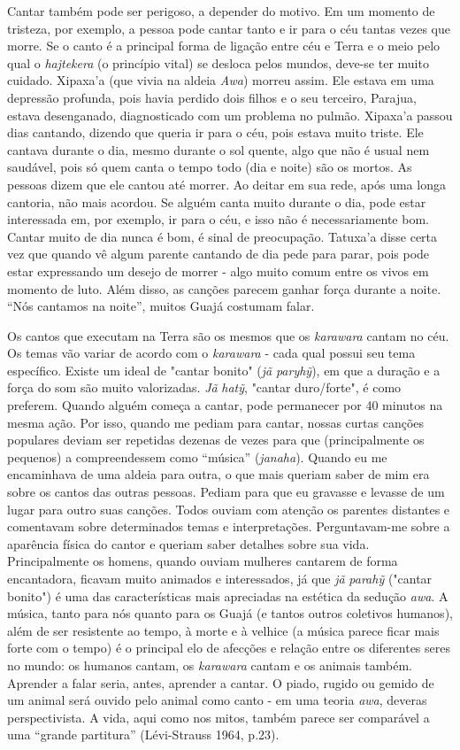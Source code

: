 Cantar também pode ser perigoso, a depender do motivo. Em um momento de
tristeza, por exemplo, a pessoa pode cantar tanto e ir para o céu tantas
vezes que morre. Se o canto é a principal forma de ligação entre céu e
Terra e o meio pelo qual o \emph{hajtekera} (o princípio vital) se
desloca pelos mundos, deve-se ter muito cuidado. Xipaxa'a (que vivia na
aldeia \emph{Awa}) morreu assim. Ele estava em uma depressão profunda,
pois havia perdido dois filhos e o seu terceiro, Parajua, estava
desenganado, diagnosticado com um problema no pulmão. Xipaxa'a passou
dias cantando, dizendo que queria ir para o céu, pois estava muito
triste. Ele cantava durante o dia, mesmo durante o sol quente, algo que
não é usual nem saudável, pois só quem canta o tempo todo (dia e noite)
são os mortos. As pessoas dizem que ele cantou até morrer. Ao deitar em
sua rede, após uma longa cantoria, não mais acordou. Se alguém canta
muito durante o dia, pode estar interessada em, por exemplo, ir para o
céu, e isso não é necessariamente bom. Cantar muito de dia nunca é bom,
é sinal de preocupação. Tatuxa'a disse certa vez que quando vê algum
parente cantando de dia pede para parar, pois pode estar expressando um
desejo de morrer - algo muito comum entre os vivos em momento de luto.
Além disso, as canções parecem ganhar força durante a noite. ``Nós
cantamos na noite'', muitos Guajá costumam falar.

Os cantos que executam na Terra são os mesmos que os \emph{karawara}
cantam no céu. Os temas vão variar de acordo com o \emph{karawara} -
cada qual possui seu tema específico. Existe um ideal de "cantar bonito"
(\emph{jã} \emph{paryhỹ}), em que a duração e a força do som são muito
valorizadas. \emph{Jã} \emph{hatỹ}, "cantar duro/forte", é como
preferem. Quando alguém começa a cantar, pode permanecer por 40 minutos
na mesma ação. Por isso, quando me pediam para cantar, nossas curtas
canções populares deviam ser repetidas dezenas de vezes para que
(principalmente os pequenos) a compreendessem como ``música''
(\emph{janaha}). Quando eu me encaminhava de uma aldeia para outra, o
que mais queriam saber de mim era sobre os cantos das outras pessoas.
Pediam para que eu gravasse e levasse de um lugar para outro suas
canções. Todos ouviam com atenção os parentes distantes e comentavam
sobre determinados temas e interpretações. Perguntavam-me sobre a
aparência física do cantor e queriam saber detalhes sobre sua vida.
Principalmente os homens, quando ouviam mulheres cantarem de forma
encantadora, ficavam muito animados e interessados, já que \emph{jã}
\emph{parahỹ} ("cantar bonito") é uma das características mais
apreciadas na estética da sedução \emph{awa}. A música, tanto para nós
quanto para os Guajá (e tantos outros coletivos humanos), além de ser
resistente ao tempo, à morte e à velhice (a música parece ficar mais
forte com o tempo) é o principal elo de afecções e relação entre os
diferentes seres no mundo: os humanos cantam, os \emph{karawara} cantam
e os animais também. Aprender a falar seria, antes, aprender a cantar. O
piado, rugido ou gemido de um animal será ouvido pelo animal como canto
- em uma teoria \emph{awa}, deveras perspectivista. A vida, aqui como
nos mitos, também parece ser comparável a uma ``grande partitura''
(Lévi-Strauss 1964, p.23).

